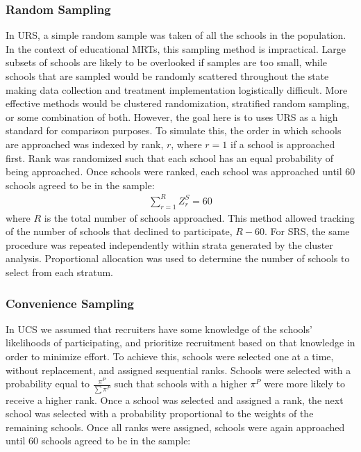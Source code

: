 \documentclass[man,floatsintext]{apa6}
\begin{document}
\hypertarget{random-sampling}{%
\subsubsection{Random Sampling}\label{random-sampling}}

In URS, a simple random sample was taken of all the schools in the population. In the context of educational MRTs, this sampling method is impractical. Large subsets of schools are likely to be overlooked if samples are too small, while schools that are sampled would be randomly scattered throughout the state making data collection and treatment implementation logistically difficult. More effective methods would be clustered randomization, stratified random sampling, or some combination of both. However, the goal here is to uses URS as a high standard for comparison purposes. To simulate this, the order in which schools are approached was indexed by rank, \(r\), where \(r = 1\) if a school is approached first. Rank was randomized such that each school has an equal probability of being approached. Once schools were ranked, each school was approached until 60 schools agreed to be in the sample:
\begin{align} \label{eq:rankRS}
  \sum_{r=1}^R{Z^S_r} = 60
\end{align}
where \(R\) is the total number of schools approached. This method allowed tracking of the number of schools that declined to participate, \(R - 60\). For SRS, the same procedure was repeated independently within strata generated by the cluster analysis. Proportional allocation was used to determine the number of schools to select from each stratum.

\hypertarget{convenience-sampling}{%
\subsubsection{Convenience Sampling}\label{convenience-sampling}}

In UCS we assumed that recruiters have some knowledge of the schools' likelihoods of participating, and prioritize recruitment based on that knowledge in order to minimize effort. To achieve this, schools were selected one at a time, without replacement, and assigned sequential ranks. Schools were selected with a probability equal to \(\frac{\pi^P}{\sum\pi^P}\) such that schools with a higher \(\pi^P\) were more likely to receive a higher rank. Once a school was selected and assigned a rank, the next school was selected with a probability proportional to the weights of the remaining schools. Once all ranks were assigned, schools were again approached until 60 schools agreed to be in the sample:
\end{document}
